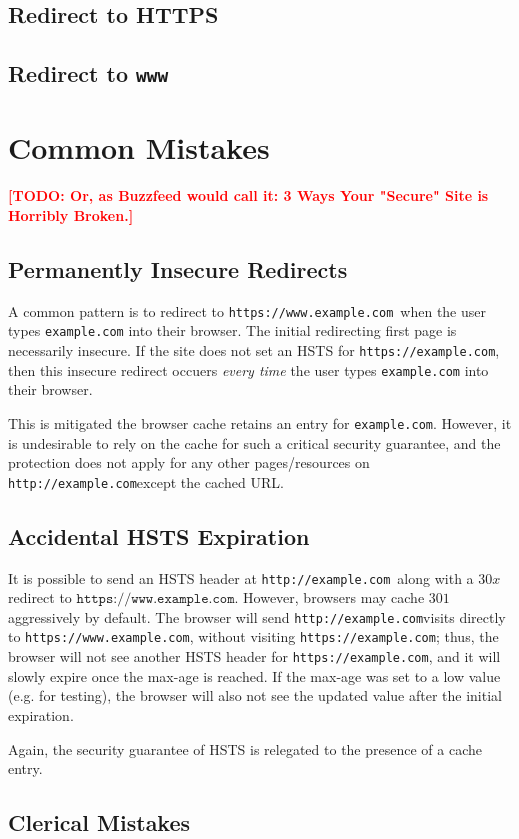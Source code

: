 \documentclass[conference]{./IEEEtran}
\newcommand{\todo}[1]{\textcolor{red}{\textbf{[TODO: #1]}}}
\newcommand{\site}[1]{\texttt{#1}}
\newcommand{\code}[1]{\texttt{#1}}
\newcommand{\genericsite}{example.com}
\newcommand{\h}{{\site{http://\genericsite}}}
\newcommand{\s}{{\site{https://\genericsite}}}
\newcommand{\sw}{{\site{https://www.\genericsite}}}
\theoremstyle{plain}
\begin{document}
\subsection{Redirect to HTTPS}

\subsection{Redirect to \code{www}}

\section{Common Mistakes}
\todo{Or, as Buzzfeed would call it: 3 Ways Your "Secure" Site is Horribly Broken.}

\subsection{Permanently Insecure Redirects}

A common pattern is to redirect to \sw~when the user types \site{\genericsite} into their browser. The initial redirecting first page is necessarily insecure. If the site does not set an HSTS for \s, then this insecure redirect occuers \emph{every time} the user types \site{\genericsite} into their browser.

This is mitigated the browser cache retains an entry for \site{\genericsite}. However, it is undesirable to rely on the cache for such a critical security guarantee, and the protection does not apply for any other pages/resources on \h except the cached URL.

\subsection{Accidental HSTS Expiration}

It is possible to send an HSTS header at \h~along with a $30x$ redirect to $\sw$. However, browsers may cache $301$ aggressively by default. The browser will send \h visits directly to \sw, without visiting \s; thus, the browser will not see another HSTS header for \s, and it will slowly expire once the max-age is reached. If the max-age was set to a low value (e.g. for testing), the browser will also not see the updated value after the initial expiration.

Again, the security guarantee of HSTS is relegated to the presence of a cache entry.

\subsection{Clerical Mistakes}
\end{document}
